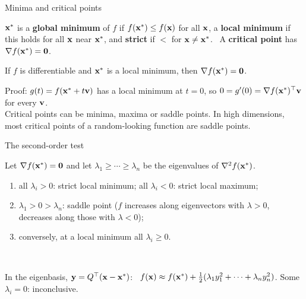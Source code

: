 \documentclass[aspectratio=1610,11pt]{beamer}
\begin{document}
\begin{frame}{Minima and critical points}
    \begin{definition}
        \small $\mathbf{x}^*$ is a \textbf{global minimum} of $f$ if $f(\mathbf{x}^*) \leq f(\mathbf{x})$ for all $\mathbf{x}$, a \textbf{local minimum} if this holds for all $\mathbf{x}$ near $\mathbf{x}^*$, and \textbf{strict} if $<$ for $\mathbf{x} \neq \mathbf{x}^*$. \ A \textbf{critical point} has $\nabla f(\mathbf{x}^*) = \mathbf{0}$.
    \end{definition}
    \begin{theorem}
        \small If $f$ is differentiable and $\mathbf{x}^*$ is a local minimum, then $\nabla f(\mathbf{x}^*) = \mathbf{0}$.
    \end{theorem}
    \small
    Proof: $g(t) = f(\mathbf{x}^* + t\mathbf{v})$ has a local minimum at $t = 0$, so $0 = g'(0) = \nabla f(\mathbf{x}^*)^\top\mathbf{v}$ for every $\mathbf{v}$.
    \\[0.5em]
    Critical points can be minima, maxima or saddle points. In high dimensions, most critical points of a random-looking function are saddle points.
\end{frame}

\begin{frame}{The second-order test}
    \begin{theorem}
        \small Let $\nabla f(\mathbf{x}^*) = \mathbf{0}$ and let $\lambda_1 \geq \cdots \geq \lambda_n$ be the eigenvalues of $\nabla^2 f(\mathbf{x}^*)$.
        \begin{enumerate}
            \item all $\lambda_i > 0$: strict local minimum; \quad all $\lambda_i < 0$: strict local maximum;
            \item $\lambda_1 > 0 > \lambda_n$: saddle point ($f$ increases along eigenvectors with $\lambda > 0$, decreases along those with $\lambda < 0$);
            \item conversely, at a local minimum all $\lambda_i \geq 0$.
        \end{enumerate}
    \end{theorem}
    \centering{}
    \\[0.1em]
    \raggedright\small In the eigenbasis, $\mathbf{y} = Q^\top(\mathbf{x} - \mathbf{x}^*)$: \ $f(\mathbf{x}) \approx f(\mathbf{x}^*) + \frac{1}{2}(\lambda_1y_1^2 + \cdots + \lambda_ny_n^2)$. Some $\lambda_i = 0$: inconclusive.
\end{frame}

\end{document}
